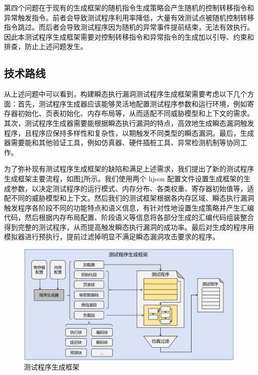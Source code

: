 第四个问题在于现有的生成框架的随机指令生成策略\cite{hur2021difuzzrtl}会产生随机的控制转移指令和异常触发指令。前者会导致测试程序利用率降低，大量有效测试点被随机控制转移指令跳过\cite{soltcascade}。而后者会导致测试程序因为随机的异常事件提前结束，无法有效执行。因此本测试程序生成框架需要对控制转移指令和异常指令的生成加以引导、约束和排查，防止上述问题发生。\par

\subsection{技术路线}

从上述问题中可以看到，构建瞬态执行漏洞测试程序生成框架需要考虑以下几个方面：首先，测试程序生成器应该能够灵活地配置测试程序参数和运行环境，例如寄存器初始化、页表初始化、内存布局等，从而适配不同威胁模型和上下文的需求。其次，测试程序生成器需要能根据瞬态执行漏洞的特点，高效地生成瞬态漏洞触发程序，且程序应保持多样性和复杂性，以期触发不同类型的瞬态漏洞。最后，生成器需要能和其他验证工具，例如仿真器、硬件插桩工具、异常检测机制等协同工作。\par

为了弥补现有测试程序生成框架的缺陷和满足上述需求，我们提出了新的测试程序生成框架主要流程，如图\ref{review:frame}所示。我们使用两个 hjson 配置文件设置生成框架的生成参数，以决定测试程序的运行模式、内存分布、各类权重、寄存器初始值等，适配不同的威胁模型和上下文。然后我们的测试框架根据各内存区域、瞬态执行漏洞触发程序各阶段不同的功能特点和语义信息，有针对性地设置生成策略并产生汇编代码，然后根据内存布局配置、阶段语义等信息将各部分生成的汇编代码组装整合得到完整的测试程序，从而提高触发瞬态执行漏洞的成功率。最后对生成的程序用模拟器进行预执行，提前过滤掉明显不满足瞬态漏洞攻击要求的程序。\par

\begin{figure}[!h]
    \centering
    \includegraphics[width=\linewidth]
    {figure/proposal/generation-frame.png}
    \caption{测试程序生成框架}
    \label{review:frame}
\end{figure}

